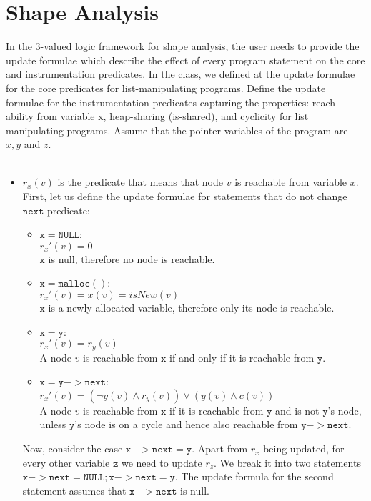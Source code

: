 \section{Shape Analysis}
In the 3-valued logic framework for shape analysis, the user needs to provide the update formulae which describe the effect of every program statement on the core and instrumentation predicates. In the class, we defined at the update formulae for the core predicates for list-manipulating programs. Define the update formulae for the instrumentation predicates capturing the properties: reach-ability from variable x, heap-sharing (is-shared), and cyclicity for list manipulating programs. Assume that the pointer variables of the program are $x,y$ and $z$.
\\ \\
\begin{itemize}
\item $r_x(v)$ is the predicate that means that node $v$ is reachable from variable $x$. First, let us define the update formulae for statements that do not change $\mathtt{next}$ predicate:
\begin{itemize}
	\item $\mathtt{x=NULL}$:\\
	$r_x'(v)=0$ \\
	$\mathtt{x}$ is null, therefore no node is reachable.
	\item $\mathtt{x=malloc()}$:\\
	$r_x'(v)=x(v)=isNew(v)$ \\
	$\mathtt{x}$ is a newly allocated variable, therefore only its node is reachable.
	\item $\mathtt{x=y}$:\\
	$r_x'(v)=r_y(v)$ \\ 
	A node $v$ is reachable from $\mathtt{x}$ if and only if it is reachable from $\mathtt{y}$.
	\item $\mathtt{x=y->next}$:\\
	$r_x'(v)=(\neg y(v)\land r_y(v))\lor (y(v)\land c(v))$ \\ 
	A node $v$ is reachable from $\mathtt{x}$ if it is reachable from $\mathtt{y}$ and is not $\mathtt{y}$'s node, unless $\mathtt{y}$'s node is on a cycle and hence also reachable from $\mathtt{y->next}$.
\end{itemize}
Now, consider the case $\mathtt{x->next=y}$. Apart from $r_x$ being updated, for every other variable $\mathtt{z}$ we need to update $r_z$. We break it into two statements \\$\mathtt{x->next=NULL; x->next=y}$. The update formula for the second statement assumes that $\mathtt{x->next}$ is null.

\end{itemize}
